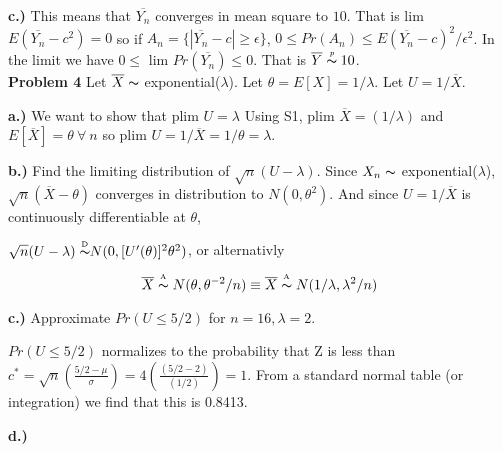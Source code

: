 \documentclass[11pt]{article}
\begin{document}
\textbf{c.)} This means that $\overline{Y_{n}}$ converges in mean square to $10$.  That is lim $E(\overline{Y_{n}} - c^{2}) = 0$ so if $A_{n} = \{|\overline{Y_{n}} - c| \ge \epsilon \}$, $0 \leq Pr(A_{n}) \leq E(\overline{Y_{n}} - c)^{2}/\epsilon^{2}$.  In the limit we have $0 \leq$ lim $ Pr(\overline{Y_{n}}) \leq 0$.  That is $\overline{Y} \thicksim\!\!\!\!\!^{{}^{p}} \ 10$.\\

\textbf{Problem 4} Let $\overline{X} \thicksim$ exponential($\lambda$). Let $\theta = E[X] = 1/\lambda$.  Let $U = 1/\overline{X}$.

\textbf{a.)} We want to show that plim $U = \lambda$  Using S1,
plim $\overline{X} = (1/\lambda)$ and $E[\overline{X}] = \theta \ \forall \ n$ so plim $U = 1/\overline{X} = 1/\theta = \lambda$.

\textbf{b.)} Find the limiting distribution of $\sqrt{n}(U - \lambda)$.
Since $X_{n} \thicksim$ exponential($\lambda$), $\sqrt{n}(\overline{X} - \theta)$ converges in distribution to $N(0, \theta^{2})$.  And since $U = 1/\overline{X}$ is continuously differentiable at $\theta$,

$\sqrt{n}(U - \lambda) \thicksim\!\!\!\!\!\!\!^{{}^{\textrm{ D}}} N(0, [U'(\theta)]^{2}\theta^{2})$, or alternativly

\[
\overline{X} \thicksim\!\!\!\!\!\!\!^{{}^{\textrm{ A}}}\  N(\theta, \theta^{-2}/n) \equiv \overline{X} \thicksim\!\!\!\!\!\!\!^{{}^{\textrm{ A}}}\ N(1/\lambda, \lambda^{2}/n)
\] 

\textbf{c.)} Approximate $Pr(U \leq 5/2)$ for $n = 16, \lambda = 2$.

$Pr(U \leq 5/2)$ normalizes to the probability that Z is less than $c^{*} = \sqrt{n}(\frac{5/2 - \mu}{\sigma}) = 4(\frac{(5/2 - 2)}{(1/2)}) = 1$.  From a standard normal table (or integration) we find that this is 0.8413.

\textbf{d.)}
\end{document}
